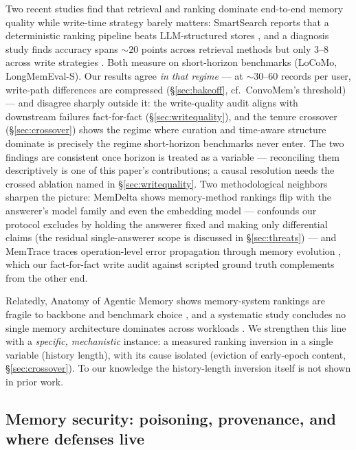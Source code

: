 Two recent studies find that retrieval and ranking dominate end-to-end
memory quality while write-time strategy barely matters: SmartSearch reports
that a deterministic ranking pipeline beats LLM-structured stores
\citep{derehag2026smartsearch}, and a diagnosis study finds accuracy spans
${\sim}20$ points across retrieval methods but only 3--8 across write
strategies \citep{yuan2026bottlenecks}. Both measure on short-horizon
benchmarks (LoCoMo, LongMemEval-S). Our results agree \emph{in that regime}
--- at ${\sim}30$--60 records per user, write-path differences are
compressed (\S\ref{sec:bakeoff}, cf.\ ConvoMem's threshold) --- and disagree
sharply outside it: the write-quality audit aligns with downstream failures
fact-for-fact (\S\ref{sec:writequality}), and the tenure crossover
(\S\ref{sec:crossover}) shows the regime where curation and time-aware
structure dominate is precisely the regime short-horizon benchmarks never
enter. The two findings are consistent once horizon is treated as a
variable --- reconciling them descriptively is one of this paper's
contributions; a causal resolution needs the crossed ablation named in
\S\ref{sec:writequality}. Two methodological
neighbors sharpen the picture: MemDelta shows memory-method rankings flip
with the answerer's model family and even the embedding model
\citep{wang2026memdelta} --- confounds our protocol excludes by holding the
answerer fixed and making only differential claims (the residual
single-answerer scope is discussed in \S\ref{sec:threats}) --- and MemTrace
traces operation-level error propagation through memory evolution
\citep{deng2026memtrace}, which our fact-for-fact write audit against
scripted ground truth complements from the other end.

Relatedly, Anatomy of Agentic Memory shows memory-system rankings are
fragile to backbone and benchmark choice \citep{jiang2026anatomy}, and a
systematic study concludes no single memory architecture dominates across
workloads \citep{zhou2026agentnative}. We strengthen this line with a
\emph{specific, mechanistic} instance: a measured ranking inversion in a
single variable (history length), with its cause isolated (eviction of
early-epoch content, \S\ref{sec:crossover}). To our knowledge the
history-length inversion itself is not shown in prior work.

\subsection{Memory security: poisoning, provenance, and where defenses
live}
\label{sec:related-security}

